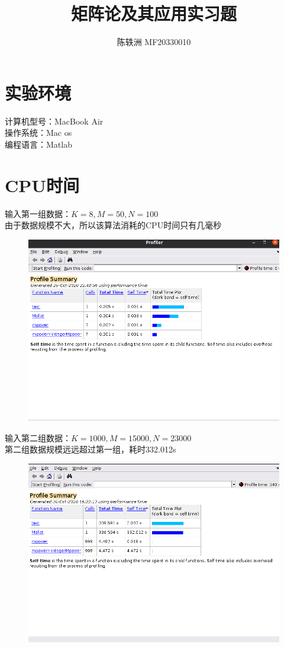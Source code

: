 \documentclass{article}
\title{矩阵论及其应用实习题}
\author{陈轶洲 MF20330010}
\begin{document}
	\maketitle
	
\section{实验环境}

计算机型号：MacBook Air \\
操作系统：Mac os\\
编程语言：Matlab
	
	
\section{CPU时间}
输入第一组数据：$ K=8,M=50,N=100 $\\
由于数据规模不大，所以该算法消耗的CPU时间只有几毫秒\\
\begin{figure}[h]
	\centering
	\includegraphics[scale=0.6]{test1.png}
\end{figure}

输入第二组数据：$ K=1000,M=15000,N=23000 $\\
第二组数据规模远远超过第一组，耗时332.012s
\begin{figure}[h]
	\centering
	\includegraphics[scale=0.6]{test2.png}
\end{figure}
\end{document}
